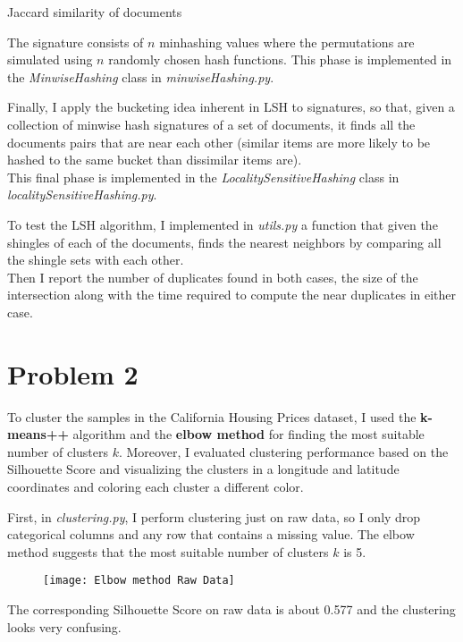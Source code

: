 \documentclass[11pt]{article}
\begin{document}
\vspace{0.1cm}
\hspace{4.7cm} Jaccard similarity of documents

\bigskip
The signature consists of $n$ minhashing values where the permutations are simulated using $n$ randomly chosen hash functions.
This phase is implemented in the \textit{MinwiseHashing} class in \textit{minwiseHashing.py}.

\bigskip
Finally, I apply the bucketing idea inherent in LSH to signatures, so that,
given a collection of minwise hash signatures of a set of documents, it finds all the documents pairs that are near each other
(similar items are more likely to be hashed to the same bucket than dissimilar items are). \\
This final phase is implemented in the \textit{LocalitySensitiveHashing} class in \textit{localitySensitiveHashing.py}.

\bigskip
To test the LSH algorithm, I implemented in \textit{utils.py} a function that given the shingles of each of the documents,
finds the nearest neighbors by comparing all the shingle sets with each other. \\
Then I report the number of duplicates found in both cases, the size of the intersection along with
the time required to compute the near duplicates in either case.


\newpage
\section{Problem 2}
To cluster the samples in the California Housing Prices dataset, I used the \textbf{k-means++} algorithm and the
\textbf{elbow method} for finding the most suitable number of clusters $k$.
Moreover, I evaluated clustering performance based on the Silhouette Score and visualizing
the clusters in a longitude and latitude coordinates and coloring each cluster a different color.

\bigskip
First, in \textit{clustering.py}, I perform clustering just on raw data, so I only drop categorical columns and any row that contains a missing value.
The elbow method suggests that the most suitable number of clusters $k$ is 5.

\begin{figure}[h]
  \centering
  \texttt{[image: Elbow method Raw Data]}
\end{figure}

\newpage
The corresponding Silhouette Score on raw data is about 0.577 and the clustering looks very confusing.
\end{document}
